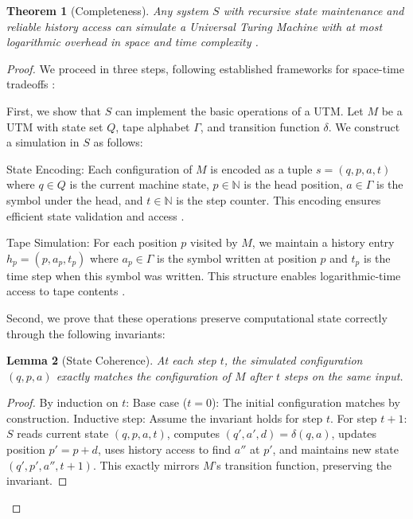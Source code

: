 \documentclass[12pt]{article}
\newtheorem{theorem}{Theorem}
\newtheorem{lemma}[theorem]{Lemma}
\begin{document}
\begin{theorem}[Completeness]
Any system $S$ with recursive state maintenance and reliable history access can simulate a Universal Turing Machine with at most logarithmic overhead in space and time complexity \cite{boyle2024memory,liskiewicz1994complexity}.
\end{theorem}

\begin{proof}
We proceed in three steps, following established frameworks for space-time tradeoffs \cite{swamy1983space,hu2014computational}:

First, we show that $S$ can implement the basic operations of a UTM. Let $M$ be a UTM with state set $Q$, tape alphabet $\Gamma$, and transition function $\delta$. We construct a simulation in $S$ as follows:

State Encoding: Each configuration of $M$ is encoded as a tuple $s = (q, p, a, t)$ where $q \in Q$ is the current machine state, $p \in \mathbb{N}$ is the head position, $a \in \Gamma$ is the symbol under the head, and $t \in \mathbb{N}$ is the step counter. This encoding ensures efficient state validation and access \cite{boyle2024memory,hu2014computational}.

Tape Simulation: For each position $p$ visited by $M$, we maintain a history entry $h_p = (p, a_p, t_p)$ where $a_p \in \Gamma$ is the symbol written at position $p$ and $t_p$ is the time step when this symbol was written. This structure enables logarithmic-time access to tape contents \cite{swamy1983space,liskiewicz1994complexity}.

Second, we prove that these operations preserve computational state correctly through the following invariants:

\begin{lemma}[State Coherence]
At each step $t$, the simulated configuration $(q, p, a)$ exactly matches the configuration of $M$ after $t$ steps on the same input.
\end{lemma}

\begin{proof}
By induction on $t$:
Base case ($t=0$): The initial configuration matches by construction.
Inductive step: Assume the invariant holds for step $t$. For step $t+1$: $S$ reads current state $(q, p, a, t)$, computes $(q', a', d) = \delta(q, a)$, updates position $p' = p + d$, uses history access to find $a''$ at $p'$, and maintains new state $(q', p', a'', t+1)$. This exactly mirrors $M$'s transition function, preserving the invariant.
\end{proof}


\end{proof}
\end{document}

